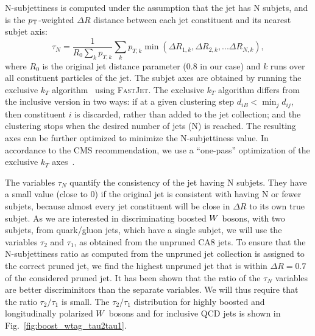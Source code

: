 N-subjettiness is computed under the assumption that the jet has N subjets, and is the
$p_{\mathrm{T}}$-weighted $\Delta R$ distance between each jet constituent and its nearest subjet axis:
\begin{equation}
\tau_N = \frac{1}{R_0 \sum_{k} p_{T, k}} \sum_k p_{T, k} \min (\Delta R_{1,k}, \Delta R_{2,k}, ...
\Delta R_{N,k}),
\end{equation}
where $R_0$ is the original jet distance parameter (0.8 in our case) and $k$ runs over all
constituent particles of the jet. 
The subjet axes are obtained by running the exclusive $k_T$
algorithm~\cite{Ellis:1993tq,Catani:1993hr} using \textsc{FastJet}. 
The exclusive $k_T$ algorithm differs from the inclusive version in two ways: if at a given
clustering step $d_{iB} < \min_j d_{ij}$, then constituent $i$ is discarded, rather than added to
the jet collection; and the clustering stops when the desired number of jets (N) is reached. 
The resulting axes can be further optimized to minimize the N-subjettiness value. In accordance to
the CMS recommendation, we use a “one-pass” optimization of the exclusive $k_T$
axes~\cite{nsubjettiness_fastjet}.

The variables $\tau_N$ quantify the consistency of the jet having N subjets. They have a small
value (close to 0) if the original jet is consistent with having N or fewer subjets, because almost
every jet constituent will be close in $\Delta R$ to its own true subjet. 
As we are interested in discriminating boosted $W$ bosons, with two subjets, from quark/gluon
jets, which have a single subjet, we will use the variables $\tau_2$ and $\tau_1$, as obtained
from the unpruned CA8 jets. To ensure that the N-subjettiness ratio as computed from the unpruned
jet collection is assigned to the correct pruned jet, we find the highest \pt unpruned jet that is
within $\Delta R = 0.7$ of the considered pruned jet.  
It has been shown that the ratio of the $\tau_N$ variables are better discriminitors than the
separate variables. We will thus require that the ratio $\tau_2 / \tau_1$ is small. The $\tau_2 /
\tau_1$ distribution for highly boosted and longitudinally polarized $W$ bosons and for inclusive
QCD jets is shown in Fig.~\ref{fig:boost_wtag_tau2tau1}. 

